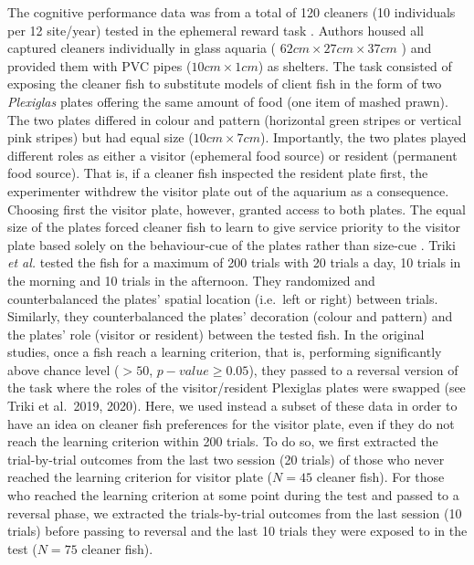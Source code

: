 \documentclass[]{rsos}%
\begin{document}
The cognitive performance data was from a total of 120 cleaners
(10 individuals per 12 site/year) tested in the
ephemeral reward task \citep{triki_Biological_2019, triki_Brain_2020}. Authors
housed all captured cleaners individually in glass aquaria
( \(62cm \times 27cm \times 37 cm\) ) and provided them
with PVC pipes (\(10 cm \times 1 cm\)) as shelters.
The task consisted of exposing the cleaner fish to substitute
models of client fish in the form of two \emph{Plexiglas} plates offering the
same amount of food (one item of mashed prawn). The two plates differed
in colour and pattern (horizontal green stripes or vertical pink stripes)
but had equal size (\(10 cm \times 7 cm\)). Importantly, the two plates played
different roles as either a visitor (ephemeral food source) or
resident (permanent food source). That is, if a cleaner fish inspected the
resident plate first, the experimenter withdrew the visitor plate out of
the aquarium as a consequence. Choosing first the visitor plate,
however, granted access to both plates. The equal size of the plates
forced cleaner fish to learn to give service priority to the visitor plate
based solely on the behaviour-cue of the plates rather than size-cue
\citep{wismer_Cuebased_2019}. Triki \emph{et al.} \citep{triki_Biological_2019, triki_Brain_2020}
tested the fish for a maximum of 200 trials with 20 trials a day, 10 trials
in the morning and 10 trials in the afternoon. They randomized and
counterbalanced the plates' spatial location (i.e.~left or right)
between trials. Similarly, they counterbalanced the plates' decoration
(colour and pattern) and the plates' role (visitor or resident) between the
tested fish. In the original studies, once a fish reach a learning criterion,
that is, performing significantly above chance level (\(> 50%
\), \(p-value ≥ 0.05\)),
they passed to a reversal version of the task where the roles of the
visitor/resident Plexiglas plates were swapped (see Triki et al.~2019, 2020).
Here, we used instead a subset of these data in order to have an idea on
cleaner fish preferences for the visitor plate, even if they do not reach
the learning criterion within 200 trials. To do so, we first extracted the
trial-by-trial outcomes from the last two session (20 trials) of those who
never reached the learning criterion for visitor plate
(\(N = 45\) cleaner fish).
For those who reached the learning criterion at some point during the
test and passed to a reversal phase, we extracted the trials-by-trial
outcomes from the last session (10 trials) before passing to reversal
and the last 10 trials they were exposed to in the test
(\(N = 75\) cleaner fish).
\end{document}
